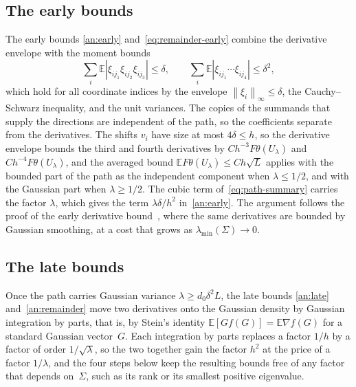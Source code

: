\documentclass[11pt,letterpaper]{article}
\newif\ifshowrev
\newenvironment{revblock}{\ifshowrev\color{revblue}%
\hypersetup{linkcolor=revblue,citecolor=revblue,urlcolor=revblue}\fi}{}
\newif\ifshowpass
\newcommand{\ps}[1]{\ifshowpass{\color{revblue}#1}\else#1\fi}
\newif\ifshowtrim
\newcommand{\trim}[1]{\ifshowtrim{\color{revblue}%
\hypersetup{linkcolor=revblue,citecolor=revblue,urlcolor=revblue}#1}\else#1\fi}
\newif\ifshownat
\newcommand{\nat}[1]{\ifshownat{\color{revblue}%
\hypersetup{linkcolor=revblue,citecolor=revblue,urlcolor=revblue}#1}\else#1\fi}
\theoremstyle{remark}
\newcommand{\E}{\mathbb E}
\newcommand{\norm}[1]{\left\lVert#1\right\rVert}
\begin{document}
\begin{revblock}
\subsection{The early bounds}\label{sec:outline-early}

The early bounds \eqref{an:early} and~\eqref{eq:remainder-early} combine
the derivative envelope with the moment bounds
\[
 \sum_i\E|\xi_{i\ps{j_1}}\xi_{i\ps{j_2}}\xi_{i\ps{j_3}}|\le\delta,\qquad
 \sum_i\E|\xi_{i\ps{j_1}}\ps{\cdots}\xi_{i\ps{j_4}}|\le\delta^2,
\]
which hold for all coordinate indices by the envelope
\(\norm{\xi_i}_\infty\le\delta\), the Cauchy--Schwarz inequality, and the
unit variances. The copies of the summands that supply the directions are
independent of the path, so the coefficients separate from the
derivatives. The shifts \(v_i\) have size at most \(4\delta\le h\), so the
derivative envelope bounds the third and fourth derivatives by
\(Ch^{-3}F\theta(U_\lambda)\) and \(Ch^{-4}F\theta(U_\lambda)\), and the
averaged bound \(\E F\theta(U_\lambda)\le Ch\sqrt L\) applies with the
bounded part of the path as the independent component when
\(\lambda\le1/2\), and with the Gaussian part when \(\lambda\ge1/2\). The
cubic term of~\eqref{eq:path-summary} carries the factor \(\lambda\),
which gives the term \(\lambda\delta/h^2\) in~\eqref{an:early}. The
argument follows the proof of \nat{the early derivative bound~\cite[Lemma~4.1]{AL}},
where the same derivatives are bounded by Gaussian smoothing, at a cost
that grows as \(\lambda_{\min}(\Sigma)\to0\).

\subsection{The late bounds}\label{sec:outline-late}

Once the path carries Gaussian variance \(\lambda\ge d_0\delta^2L\), the
late bounds \eqref{an:late} and~\eqref{an:remainder} move two derivatives
onto the Gaussian density by Gaussian integration by parts, that is, by
Stein's identity \(\E[Gf(G)]=\E\nabla f(G)\) for a standard Gaussian
vector~\(G\). \trim{Each integration by parts replaces a factor
\(1/h\) by a factor of order \(1/\sqrt\lambda\), so the two together
gain the factor \(h^2\) at the price of a factor \(1/\lambda\)}, and the
four \trim{steps} below keep the resulting bounds free
of any factor that depends on~\(\Sigma\), such as its rank or its
smallest positive eigenvalue.


\end{revblock}
\end{document}
